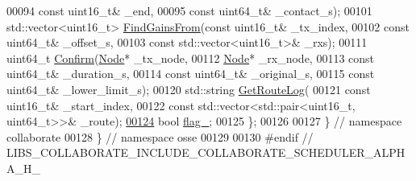 \begin{DoxyCode}
00094       \textcolor{keyword}{const} uint16\_t& \_end,
00095       \textcolor{keyword}{const} uint64\_t& \_contact\_s);
00101   std::vector<uint16\_t> \hyperlink{classosse_1_1collaborate_1_1_scheduler_alpha_a6cf7cf015650e1837c6ae65bda26ff95}{FindGainsFrom}(\textcolor{keyword}{const} uint16\_t& \_tx\_index,
00102                                       \textcolor{keyword}{const} uint64\_t& \_offset\_s,
00103                                       \textcolor{keyword}{const} std::vector<uint16\_t>& \_rxs);
00111   uint64\_t \hyperlink{classosse_1_1collaborate_1_1_scheduler_alpha_adc69d9527006a9eccc142f9369c93cb5}{Confirm}(\hyperlink{classosse_1_1collaborate_1_1_node}{Node}* \_tx\_node,
00112                    \hyperlink{classosse_1_1collaborate_1_1_node}{Node}* \_rx\_node,
00113                    \textcolor{keyword}{const} uint64\_t& \_duration\_s,
00114                    \textcolor{keyword}{const} uint64\_t& \_original\_s,
00115                    \textcolor{keyword}{const} uint64\_t& \_lower\_limit\_s);
00120   std::string \hyperlink{classosse_1_1collaborate_1_1_scheduler_alpha_a66f56e307485a3ab62b625324006d945}{GetRouteLog}(
00121       \textcolor{keyword}{const} uint16\_t& \_start\_index,
00122       \textcolor{keyword}{const} std::vector<std::pair<uint16\_t, uint64\_t>>& \_route);
\hyperlink{classosse_1_1collaborate_1_1_scheduler_alpha_a98ad63ff3f5454a21f08296db3d6fc6d}{00124}   \textcolor{keywordtype}{bool} \hyperlink{classosse_1_1collaborate_1_1_scheduler_alpha_a98ad63ff3f5454a21f08296db3d6fc6d}{flag\_};
00125 \};
00126 
00127 \}  \textcolor{comment}{// namespace collaborate}
00128 \}  \textcolor{comment}{// namespace osse}
00129 
00130 \textcolor{preprocessor}{#endif  // LIBS\_COLLABORATE\_INCLUDE\_COLLABORATE\_SCHEDULER\_ALPHA\_H\_}
\end{DoxyCode}
